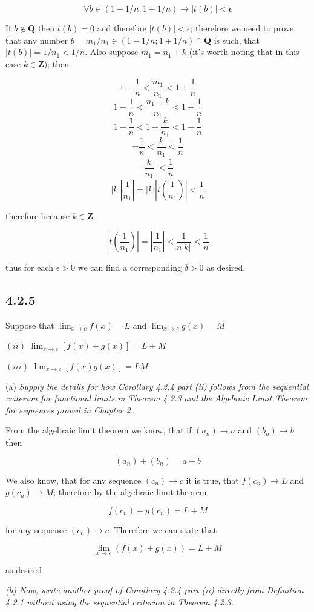 \documentclass[11pt,oneside,titlepage]{book}
\begin{document}
$$\forall b \in (1 - 1/n; 1 + 1/n) \to |t(b)| < \epsilon$$

If $b \notin \textbf{Q} $ then $t(b) = 0$ and therefore $|t(b)| < \epsilon$; therefore we need to prove,
that any number $b = m_1/n_1 \in (1 - 1/n; 1 + 1/n) \cap \textbf{Q}$ is such, that $|t(b)| = 1/n_1 < 1/n$.
Also suppose $m_1 = n_1 + k$ (it's worth noting that in this case $k \in \textbf{Z}$); then

$$ 1 - \frac{1}{n} < \frac{m_1}{n_1} < 1 + \frac{1}{n}$$
$$ 1 - \frac{1}{n} < \frac{n_1 + k}{n_1} < 1 + \frac{1}{n}$$
$$ 1 - \frac{1}{n} < 1 + \frac{k}{n_1} < 1 + \frac{1}{n}$$
$$ - \frac{1}{n} <  \frac{k}{n_1} <  \frac{1}{n}$$
$$ |\frac{k}{n_1}| <  \frac{1}{n}$$
$$ |k||\frac{1}{n_1}| = |k||t(\frac{1}{n_1})| <  \frac{1}{n}$$

therefore because $k \in \textbf{Z}$

$$ |t(\frac{1}{n_1})| = |\frac{1}{n_1}| <  \frac{1}{n|k|} < \frac{1}{n}$$

thus for each $\epsilon > 0$ we can find a corresponding $\delta > 0$ as desired.

\subsection*{4.2.5}
Suppose that $\lim_{x \to c} f(x) = L$ and $\lim_{x \to c} g(x) = M$

$(ii)$ $\lim_{x \to c}[f(x) + g(x)] = L + M$

$(iii)$ $\lim_{x \to c}[f(x) g(x)] = L M$

(a)\textit{ Supply the details for how Corollary 4.2.4 part (ii) follows from the sequential criterion for functional limits in Theorem 4.2.3 and the Algebraic Limit Theorem for sequences proved in Chapter 2.}

From the algebraic limit theorem we know, that if $(a_n) \to a$ and $(b_n) \to b$ then

$$(a_n) + (b_n) = a + b$$

We also know, that for any sequence $(c_n) \to c$ it is true, that $f(c_n) \to L$ and $g(c_n) \to M$;
therefore by the algebraic limit theorem

$$f(c_n) + g(c_n) = L + M$$

for any sequence $(c_n) \to c$. Therefore we can state that

$$\lim_{x \to c}(f(x) + g(x)) = L + M $$

as desired

\textit{(b) Now, write another proof of Corollary 4.2.4 part (ii) directly from Definition 4.2.1 without using the sequential criterion in Theorem 4.2.3.}
\end{document}

